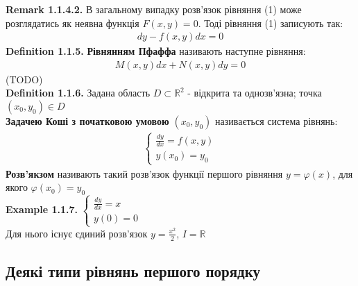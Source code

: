 \documentclass[a4paper, 14pt]{extarticle}
\def\huge{\displaystyle}
\def\defin#1{\textbf{Definition {#1}}}
\def\ex#1{\textbf{Example {#1}}}
\def\rm#1{\textbf{Remark {#1}}}
\def\bigline{\vspace{5mm}\\}
\begin{document}
	\rm{1.1.4.2.} В загальному випадку розв'язок рівняння (1) може розглядатись як неявна функція $F(x,y)=0$. Тоді рівняння (1) записують так:
	\begin{align*}
	dy - f(x,y)dx=0
	\end{align*}
	\defin{1.1.5.} \textbf{Рівнянням Пфаффа} називають наступне рівняння:
	\begin{align}
	M(x,y)dx + N(x,y)dy=0
	\end{align}
	(TODO)
	\bigline
	\defin{1.1.6.} Задана область $D \subset \mathbb{R}^2$ - відкрита та однозв'язна; точка $(x_0, y_0) \in D$\\
	\textbf{Задачею Коші з початковою умовою} $(x_0,y_0)$ називається система рівнянь:
	\begin{align*}
	\begin{cases}
	\displaystyle \frac{dy}{dx}=f(x,y)\\
	y(x_0)=y_0
	\end{cases}
	\end{align*}
	\textbf{Розв'якзом} називають такий розв'язок функції першого рівняння $y=\varphi(x)$, для якого $\varphi(x_0)=y_0$
	\bigline
	\ex{1.1.7.}
	$
	\begin{cases}
	\displaystyle \frac{dy}{dx}=x\\
	y(0)=0
	\end{cases}
	$\\
	Для нього існує єдиний розв'язок $\huge y = \frac{x^2}{2}$, $I=\mathbb{R}$
	\bigline
	
	\subsection{Деякі типи рівнянь першого порядку}
\end{document}

